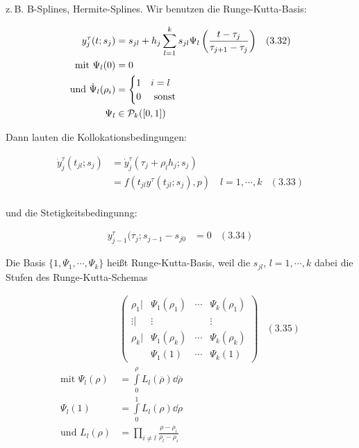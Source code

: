 
z.\,B. B-Splines, Hermite-Splines. Wir benutzen die Runge-Kutta-Basis:

\begin{align*}
y_j^\tau(t;s_j) &= s_{jl} + h_j \sum\limits_{l=1}^k s_{jl} \Psi_l \left( \frac{t-\tau_j}{\tau_{j+1}-\tau_j} \right) & (3.32) \\
\text{mit } \Psi_l(0) &= 0 \\
\text{und } \dot\Psi_l(\rho_i) &= \begin{cases} 1 & i=l \\ 0 & \text{ sonst } \end{cases} \\
\Psi_l & \in \mathcal{P}_k([0,1])
\end{align*}

Dann lauten die Kollokationsbedingungen:

\begin{align*}
\dot y_j^\tau(t_{jl}; s_j) &= \dot y_j^\tau(\tau_j+\rho_l h_j; s_j) \\
&= f(t_{jl} y^\tau(t_{jl}; s_j),p) \quad l=1,\cdots,k & (3.33) \\
\end{align*}

und die Stetigkeitsbedingunng:

\begin{align*}
y_{j-1}^\tau (\tau_j; s_{j-1} - s_{j0} &= 0 & (3.34) 
\end{align*}

Die Basis $\{1,\Psi_1,\cdots,\Psi_k\}$ heißt Runge-Kutta-Basis, weil die $s_{jl}$, $l=1,\cdots,k$ dabei die Stufen des Runge-Kutta-Schemas

\begin{align*}
& \begin{pmatrix} \rho_1 | & \Psi_1(\rho_1) & \cdots & \Psi_k(\rho_1) \\ \vdots | & \vdots & & \vdots \\ \rho_k | & \Psi_1(\rho_k) & \cdots & \Psi_k(\rho_k) \\ & \Psi_1(1) & \cdots & \Psi_k(1) \end{pmatrix}  & (3.35)\\ 
\text{mit } \Psi_l(\rho) &= \int\limits_0^\rho L_l ( \overline \rho) \dd \overline \rho \\
\Psi_l(1) &= \int\limits_0^1 L_l (\rho) \dd \rho \\
\text{und } L_l(\rho) &= \prod\limits_{i \neq l} \frac{\rho-\rho_i}{\rho_l-\rho_i}
\end{align*}

